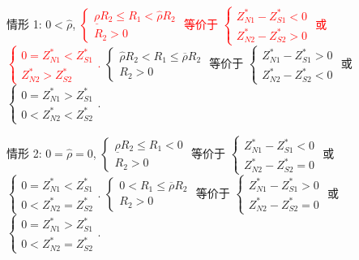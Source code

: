 \documentclass[10.0pt]{article}
\newcommand{\hhred}{\textcolor{red}}
\begin{document}
情形 1: $ 0 < {\hat \rho} $, \hhred{$ \left\{ \begin{matrix} \underline{\rho} R_2 \leqslant R_1 < {\hat \rho} R_2 \\ R_2 > 0 \end{matrix} \right. $ 等价于 $ \left\{ \begin{matrix} Z_{N 1}^* - Z_{S 1}^* < 0 \\ Z_{N 2}^* - Z_{S 2}^* > 0 \end{matrix} \right. $ 或 $ \left\{ \begin{matrix} 0 = Z_{N 1}^* < Z_{S 1}^* \\ Z_{N 2}^* > Z_{S 2}^* \end{matrix} \right. $.} $ \left\{ \begin{matrix} {\hat \rho} R_2 < R_1 \leqslant \overline{\rho} R_2 \\ R_2 > 0 \end{matrix} \right. $ 等价于 $ \left\{ \begin{matrix} Z_{N 1}^* - Z_{S 1}^* > 0 \\ Z_{N 2}^* - Z_{S 2}^* < 0 \end{matrix} \right. $ 或 $ \left\{ \begin{matrix} 0 = Z_{N 1}^* > Z_{S 1}^* \\ 0 < Z_{N 2}^* < Z_{S 2}^* \end{matrix} \right. $.

情形 2: $ 0 = {\hat \rho} = 0 $, $ \left\{ \begin{matrix} \underline{\rho} R_2 \leqslant R_1 < 0 \\ R_2 > 0 \end{matrix} \right. $ 等价于 $ \left\{ \begin{matrix} Z_{N 1}^* - Z_{S 1}^* < 0 \\ Z_{N 2}^* - Z_{S 2}^* = 0 \end{matrix} \right. $ 或 $ \left\{ \begin{matrix} 0 = Z_{N 1}^* < Z_{S 1}^* \\ 0 < Z_{N 2}^* = Z_{S 2}^* \end{matrix} \right. $. $ \left\{ \begin{matrix} 0 < R_1 \leqslant \overline{\rho} R_2 \\ R_2 > 0 \end{matrix} \right. $ 等价于 $ \left\{ \begin{matrix} Z_{N 1}^* - Z_{S 1}^* > 0 \\ Z_{N 2}^* - Z_{S 2}^* = 0 \end{matrix} \right. $ 或 $ \left\{ \begin{matrix} 0 = Z_{N 1}^* > Z_{S 1}^* \\ 0 < Z_{N 2}^* = Z_{S 2}^* \end{matrix} \right. $.
\end{document}

